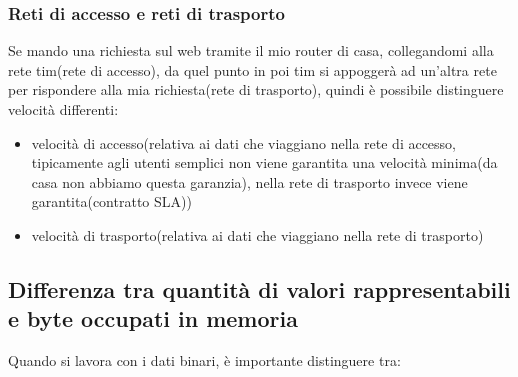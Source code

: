 \subsubsection{Reti di accesso e reti di trasporto}
Se mando una richiesta sul web tramite il mio router di casa, collegandomi alla rete tim(rete di accesso), da quel punto in poi tim si appoggerà ad un’altra rete per rispondere alla mia richiesta(rete di trasporto), quindi è possibile distinguere velocità differenti: 
\begin{itemize}
    \item velocità di accesso(relativa ai dati che viaggiano nella rete di accesso, tipicamente agli utenti semplici non viene garantita una velocità minima(da casa non abbiamo questa garanzia), nella rete di trasporto invece viene garantita(contratto SLA))
    \item velocità di trasporto(relativa ai dati che viaggiano nella rete di trasporto)
\end{itemize}


\subsection*{Differenza tra quantità di valori rappresentabili e byte occupati in memoria}

Quando si lavora con i dati binari, è importante distinguere tra:

